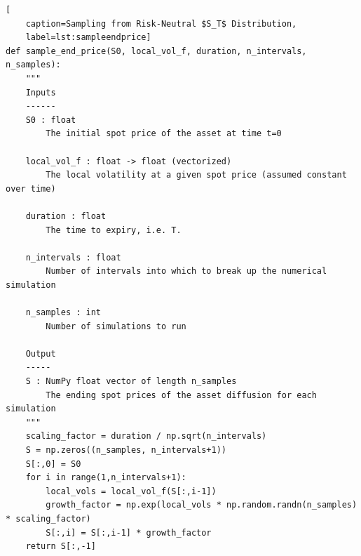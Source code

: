 \documentclass[12pt]{article}
\numberwithin{equation}{section}
\begin{document}
\begin{lstlisting}[
    caption=Sampling from Risk-Neutral $S_T$ Distribution,
    label=lst:sampleendprice]
def sample_end_price(S0, local_vol_f, duration, n_intervals, n_samples):
    """
    Inputs
    ------
    S0 : float
        The initial spot price of the asset at time t=0
        
    local_vol_f : float -> float (vectorized)
        The local volatility at a given spot price (assumed constant over time)
        
    duration : float
        The time to expiry, i.e. T.
    
    n_intervals : float
        Number of intervals into which to break up the numerical simulation
    
    n_samples : int
        Number of simulations to run
        
    Output
    -----
    S : NumPy float vector of length n_samples
        The ending spot prices of the asset diffusion for each simulation
    """
    scaling_factor = duration / np.sqrt(n_intervals)
    S = np.zeros((n_samples, n_intervals+1))
    S[:,0] = S0
    for i in range(1,n_intervals+1):
        local_vols = local_vol_f(S[:,i-1])
        growth_factor = np.exp(local_vols * np.random.randn(n_samples) * scaling_factor)
        S[:,i] = S[:,i-1] * growth_factor
    return S[:,-1]
\end{lstlisting}
\end{document}

